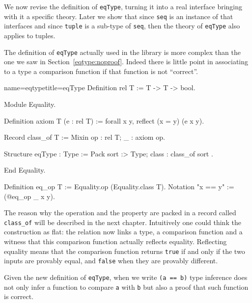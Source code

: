 We now revise the definition of \lstinline/eqType/, turning it into a
real interface bringing with it a specific theory.  Later we show that
since \lstinline/seq/ is an instance of that interfaces and since
\lstinline/tuple/ is a sub-type of \lstinline/seq/, then the theory
of \lstinline/eqType/ also applies to tuples.


The definition of \lstinline/eqType/ actually used in the \mcbMC{}
library is more complex than the one we saw in
Section~\ref{eqtype:noproof}.  Indeed there is little point in
associating to a type a comparison function if that function is
not ``correct''.

\begin{coq}{name=eqtype}{title=eqType}
Definition rel T := T -> T -> bool.

Module Equality.

Definition axiom T (e : rel T) := forall x y, reflect (x = y) (e x y).

Record class_of T := Mixin {op : rel T; _ : axiom op}.

Structure eqType : Type := Pack {
  sort :> Type;
  class : class_of sort
}.

End Equality.

Definition eq_op T := Equality.op (Equality.class T).
Notation "x == y" := (@eq_op _ x y).
\end{coq}

The reason why the operation and the property are packed in
a record called \lstinline/class_of/ will be described in the next
chapter.
Intuitively one could think the construction as flat:
the relation now links a type, a comparison function and a
witness that this comparison function actually reflects equality.
Reflecting equality means that the comparison function returns
\lstinline/true/ if and only if the two inputs are provably equal, and
\lstinline/false/ when they are provably different.


Given the new definition of \lstinline/eqType/,
when we write \lstinline/(a == b)/ type inference does not only infer
a function to compare \lstinline/a/ with \lstinline/b/ but also a
proof that such function is correct.

